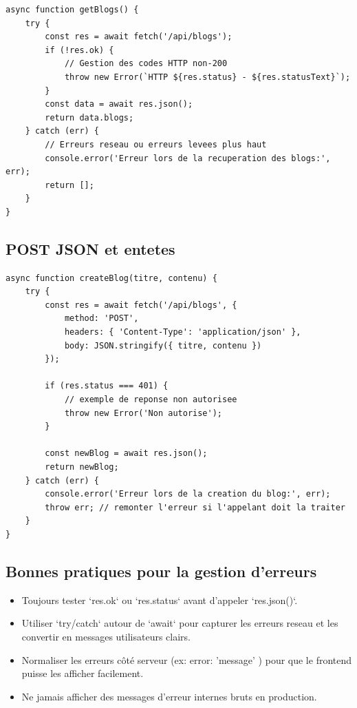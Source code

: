 \documentclass[a4paper,12pt]{book}
\begin{document}
\begin{lstlisting}[style=javascript,caption=Exemple fetch - requete GET avec gestion d'erreur]
async function getBlogs() {
    try {
        const res = await fetch('/api/blogs');
        if (!res.ok) {
            // Gestion des codes HTTP non-200
            throw new Error(`HTTP ${res.status} - ${res.statusText}`);
        }
        const data = await res.json();
        return data.blogs;
    } catch (err) {
        // Erreurs reseau ou erreurs levees plus haut
        console.error('Erreur lors de la recuperation des blogs:', err);
        return [];
    }
}
\end{lstlisting}

\subsection{POST JSON et entetes}

\begin{lstlisting}[style=javascript,caption=Exemple fetch - POST avec JSON]
async function createBlog(titre, contenu) {
    try {
        const res = await fetch('/api/blogs', {
            method: 'POST',
            headers: { 'Content-Type': 'application/json' },
            body: JSON.stringify({ titre, contenu })
        });

        if (res.status === 401) {
            // exemple de reponse non autorisee
            throw new Error('Non autorise');
        }

        const newBlog = await res.json();
        return newBlog;
    } catch (err) {
        console.error('Erreur lors de la creation du blog:', err);
        throw err; // remonter l'erreur si l'appelant doit la traiter
    }
}
\end{lstlisting}

\subsection{Bonnes pratiques pour la gestion d'erreurs}

\begin{itemize}
    \item Toujours tester `res.ok` ou `res.status` avant d'appeler `res.json()`.
    \item Utiliser `try/catch` autour de `await` pour capturer les erreurs reseau et les convertir en messages utilisateurs clairs.
    \item Normaliser les erreurs c\^ot\'e serveur (ex: { error: 'message' }) pour que le frontend puisse les afficher facilement.
    \item Ne jamais afficher des messages d'erreur internes bruts en production.
\end{itemize}
\end{document}
